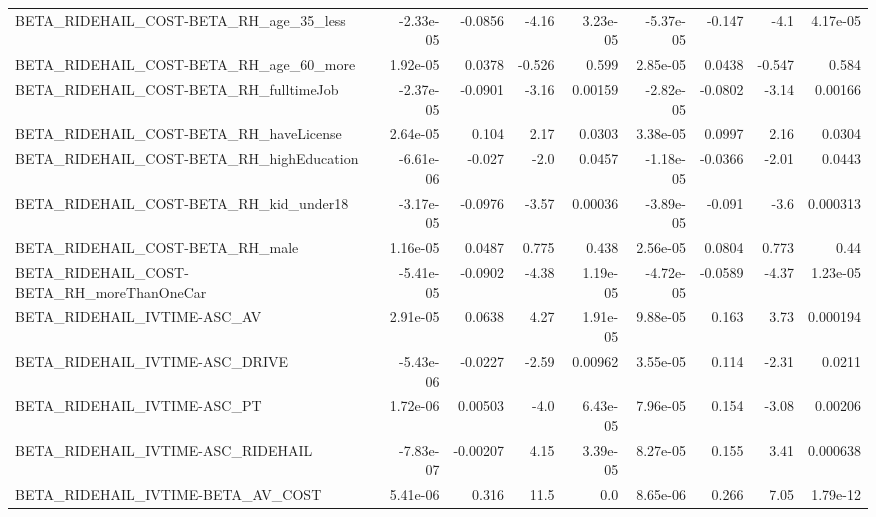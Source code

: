 \begin{tabular}{lrrrrrrrr}
BETA\_RIDEHAIL\_COST-BETA\_RH\_age\_35\_less             &   -2.33e-05 &      -0.0856 &    -4.16 & 3.23e-05 &  -5.37e-05 &      -0.147 &         -4.1 &      4.17e-05 \\
BETA\_RIDEHAIL\_COST-BETA\_RH\_age\_60\_more             &    1.92e-05 &       0.0378 &   -0.526 &    0.599 &   2.85e-05 &      0.0438 &       -0.547 &         0.584 \\
BETA\_RIDEHAIL\_COST-BETA\_RH\_fulltimeJob             &   -2.37e-05 &      -0.0901 &    -3.16 &  0.00159 &  -2.82e-05 &     -0.0802 &        -3.14 &       0.00166 \\
BETA\_RIDEHAIL\_COST-BETA\_RH\_haveLicense             &    2.64e-05 &        0.104 &     2.17 &   0.0303 &   3.38e-05 &      0.0997 &         2.16 &        0.0304 \\
BETA\_RIDEHAIL\_COST-BETA\_RH\_highEducation           &   -6.61e-06 &       -0.027 &     -2.0 &   0.0457 &  -1.18e-05 &     -0.0366 &        -2.01 &        0.0443 \\
BETA\_RIDEHAIL\_COST-BETA\_RH\_kid\_under18             &   -3.17e-05 &      -0.0976 &    -3.57 &  0.00036 &  -3.89e-05 &      -0.091 &         -3.6 &      0.000313 \\
BETA\_RIDEHAIL\_COST-BETA\_RH\_male                    &    1.16e-05 &       0.0487 &    0.775 &    0.438 &   2.56e-05 &      0.0804 &        0.773 &          0.44 \\
BETA\_RIDEHAIL\_COST-BETA\_RH\_moreThanOneCar          &   -5.41e-05 &      -0.0902 &    -4.38 & 1.19e-05 &  -4.72e-05 &     -0.0589 &        -4.37 &      1.23e-05 \\
BETA\_RIDEHAIL\_IVTIME-ASC\_AV                        &    2.91e-05 &       0.0638 &     4.27 & 1.91e-05 &   9.88e-05 &       0.163 &         3.73 &      0.000194 \\
BETA\_RIDEHAIL\_IVTIME-ASC\_DRIVE                     &   -5.43e-06 &      -0.0227 &    -2.59 &  0.00962 &   3.55e-05 &       0.114 &        -2.31 &        0.0211 \\
BETA\_RIDEHAIL\_IVTIME-ASC\_PT                        &    1.72e-06 &      0.00503 &     -4.0 & 6.43e-05 &   7.96e-05 &       0.154 &        -3.08 &       0.00206 \\
BETA\_RIDEHAIL\_IVTIME-ASC\_RIDEHAIL                  &   -7.83e-07 &     -0.00207 &     4.15 & 3.39e-05 &   8.27e-05 &       0.155 &         3.41 &      0.000638 \\
BETA\_RIDEHAIL\_IVTIME-BETA\_AV\_COST                  &    5.41e-06 &        0.316 &     11.5 &      0.0 &   8.65e-06 &       0.266 &         7.05 &      1.79e-12 \\

\end{tabular}
